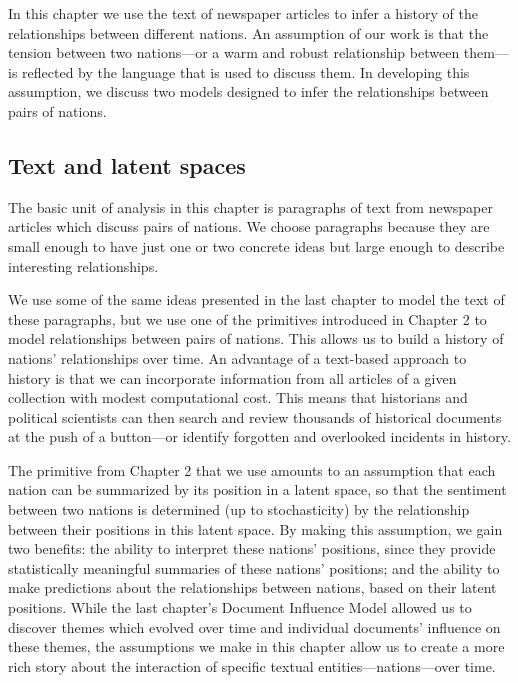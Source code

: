 In this chapter we use the text of newspaper articles to infer a
history of the relationships between different nations.  An assumption
of our work is that the tension between two nations---or a warm and
robust relationship between them---is reflected by the language that
is used to discuss them.  In developing this assumption, we
discuss two models designed to infer the relationships between pairs
of nations.

\subsection*{Text and latent spaces}
The basic unit of analysis in this chapter is paragraphs of text
from newspaper articles which discuss pairs of nations.  We choose
paragraphs because they are small enough to have just one or two
concrete ideas but large enough to describe interesting
relationships.

We use some of the same ideas presented in the last chapter to
model the text of these paragraphs, but we use one of the
primitives introduced in Chapter 2 to model relationships between
pairs of nations.  This allows us to build a history of nations'
relationships over time.  An advantage of a text-based approach to
history is that we can incorporate information from all articles of a
given collection with modest computational cost.  This means that
historians and political scientists can then search and review
thousands of historical documents at the push of a button---or
identify forgotten and overlooked incidents in history.

The primitive from Chapter 2 that we use amounts to an assumption
that each nation can be summarized by its position in a latent space,
so that the sentiment between two nations is determined (up to
stochasticity) by the relationship between their positions in this
latent space.  By making this assumption, we gain two benefits:
the ability to interpret these nations' positions, since they provide
statistically meaningful summaries of these nations' positions; and
the ability to make predictions about the relationships between
nations, based on their latent positions. While the last chapter's
Document Influence Model allowed us to discover themes which evolved
over time and individual documents' influence on these themes, the
assumptions we make in this chapter allow us to create a
more rich story about the interaction of specific textual
entities---nations---over time.


